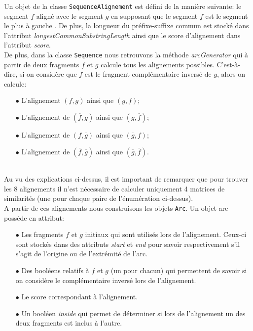 Un objet de la classe \verb|SequenceAlignement| est défini de la manière
suivante: le segment $f$ aligné avec le segment $g$ en supposant que le
segment $f$ est le segment le plus à \og gauche \fg. De plus, la longueur du
préfixe-suffixe commun est stocké dans l'attribut \emph{longestCommonSubstringLength} ainsi que le score d'alignement dans l'attribut \emph{score}.\\

De plus, dans la classe \verb|Sequence| nous retrouvons la méthode \emph{arcGenerator} qui à partir de deux fragments $f$ et $g$ calcule tous les alignements possibles. C'est-à-dire, si on considère que $\overline{f}$ est le fragment complémentaire inversé de $g$, alors on calcule:\\
\begin{itemize}
	\item[$\bullet$] L'alignement $(f,g)$ ainsi que $(g,f)$;
	\item[$\bullet$] L'alignement de $(\overline{f},g)$ ainsi que $(g, \overline{f})$;
	\item[$\bullet$] L'alignement de $(f, \overline{g})$ ainsi que $(\overline{g},f)$;
	\item[$\bullet$] L'alignement de $(\overline{f}, \overline{g})$ ainsi que $(\overline{g}, \overline{f})$.
\end{itemize}
$ $\\
Au vu des explications ci-dessus, il est important de remarquer que pour trouver les 8 alignements il n'est nécessaire de calculer uniquement 4 matrices de similarités (une pour chaque paire de l'énumération ci-dessus).\\

A partir de ces alignements nous construisons les objets \verb|Arc|. Un objet arc possède en attribut:\\

\begin{itemize}
	\item[$\bullet$] Les fragments $f$ et $g$ initiaux qui sont utilisés lors de l'alignement. Ceux-ci sont stockés dans des attributs \emph{start} et \emph{end} pour savoir respectivement s'il s'agit de l'origine ou de l'extrémité de l'arc.
	\item[$\bullet$] Des booléens relatifs à $f$ et $g$ (un pour chacun) qui permettent de savoir si on considère le complémentaire inversé lors de l'alignement.
	\item[$\bullet$] Le score correspondant à l'alignement.
	\item[$\bullet$] Un booléen \emph{inside} qui permet de déterminer si lors de l'alignement un des deux fragments est inclus à l'autre.
	
\end{itemize}


